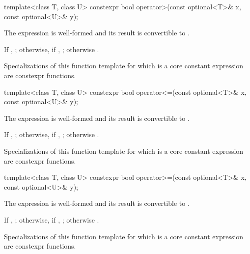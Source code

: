 %
\begin{itemdecl}
template<class T, class U> constexpr bool operator>(const optional<T>& x, const optional<U>& y);
\end{itemdecl}

\begin{itemdescr}
\pnum
\mandates
The expression  is well-formed and
its result is convertible to .

\pnum
\returns
If , ;
otherwise, if , ;
otherwise .

\pnum
\remarks
Specializations of this function template
for which  is a core constant expression
are constexpr functions.
\end{itemdescr}

%
\begin{itemdecl}
template<class T, class U> constexpr bool operator<=(const optional<T>& x, const optional<U>& y);
\end{itemdecl}

\begin{itemdescr}
\pnum
\mandates
The expression  is well-formed and
its result is convertible to .

\pnum
\returns
If , ;
otherwise, if , ;
otherwise .

\pnum
\remarks
Specializations of this function template
for which  is a core constant expression
are constexpr functions.
\end{itemdescr}

%
\begin{itemdecl}
template<class T, class U> constexpr bool operator>=(const optional<T>& x, const optional<U>& y);
\end{itemdecl}

\begin{itemdescr}
\pnum
\mandates
The expression  is well-formed and
its result is convertible to .

\pnum
\returns
If , ;
otherwise, if , ;
otherwise .

\pnum
\remarks
Specializations of this function template
for which  is a core constant expression
are constexpr functions.
\end{itemdescr}

